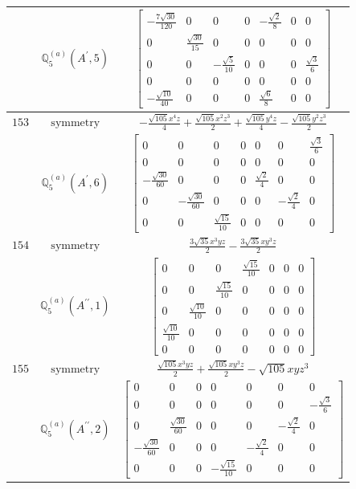 \documentclass[fleqn,8pt,landscape]{jsarticle}
\begin{document}
\begin{longtable}{ccc}
$  $ & $ \mathbb{Q}_{5}^{(a)}(A^{\prime},5) $ & $ \begin{bmatrix} - \frac{7 \sqrt{30}}{120} & 0 & 0 & 0 & - \frac{\sqrt{2}}{8} & 0 & 0 \\ 0 & \frac{\sqrt{30}}{15} & 0 & 0 & 0 & 0 & 0 \\ 0 & 0 & - \frac{\sqrt{5}}{10} & 0 & 0 & 0 & \frac{\sqrt{3}}{6} \\ 0 & 0 & 0 & 0 & 0 & 0 & 0 \\ - \frac{\sqrt{10}}{40} & 0 & 0 & 0 & \frac{\sqrt{6}}{8} & 0 & 0 \end{bmatrix} $ \\ \hline
$ 153 $ & $ \text{symmetry} $ & $ - \frac{\sqrt{105} x^{4} z}{4} + \frac{\sqrt{105} x^{2} z^{3}}{2} + \frac{\sqrt{105} y^{4} z}{4} - \frac{\sqrt{105} y^{2} z^{3}}{2} $ \\
$  $ & $ \mathbb{Q}_{5}^{(a)}(A^{\prime},6) $ & $ \begin{bmatrix} 0 & 0 & 0 & 0 & 0 & 0 & \frac{\sqrt{3}}{6} \\ 0 & 0 & 0 & 0 & 0 & 0 & 0 \\ - \frac{\sqrt{30}}{60} & 0 & 0 & 0 & \frac{\sqrt{2}}{4} & 0 & 0 \\ 0 & - \frac{\sqrt{30}}{60} & 0 & 0 & 0 & - \frac{\sqrt{2}}{4} & 0 \\ 0 & 0 & \frac{\sqrt{15}}{10} & 0 & 0 & 0 & 0 \end{bmatrix} $ \\ \hline
$ 154 $ & $ \text{symmetry} $ & $ \frac{3 \sqrt{35} x^{3} y z}{2} - \frac{3 \sqrt{35} x y^{3} z}{2} $ \\
$  $ & $ \mathbb{Q}_{5}^{(a)}(A^{\prime\prime},1) $ & $ \begin{bmatrix} 0 & 0 & 0 & \frac{\sqrt{15}}{10} & 0 & 0 & 0 \\ 0 & 0 & \frac{\sqrt{15}}{10} & 0 & 0 & 0 & 0 \\ 0 & \frac{\sqrt{10}}{10} & 0 & 0 & 0 & 0 & 0 \\ \frac{\sqrt{10}}{10} & 0 & 0 & 0 & 0 & 0 & 0 \\ 0 & 0 & 0 & 0 & 0 & 0 & 0 \end{bmatrix} $ \\ \hline
$ 155 $ & $ \text{symmetry} $ & $ \frac{\sqrt{105} x^{3} y z}{2} + \frac{\sqrt{105} x y^{3} z}{2} - \sqrt{105} x y z^{3} $ \\
$  $ & $ \mathbb{Q}_{5}^{(a)}(A^{\prime\prime},2) $ & $ \begin{bmatrix} 0 & 0 & 0 & 0 & 0 & 0 & 0 \\ 0 & 0 & 0 & 0 & 0 & 0 & - \frac{\sqrt{3}}{6} \\ 0 & \frac{\sqrt{30}}{60} & 0 & 0 & 0 & - \frac{\sqrt{2}}{4} & 0 \\ - \frac{\sqrt{30}}{60} & 0 & 0 & 0 & - \frac{\sqrt{2}}{4} & 0 & 0 \\ 0 & 0 & 0 & - \frac{\sqrt{15}}{10} & 0 & 0 & 0 \end{bmatrix} $ \\ \hline

\end{longtable}
\end{document}
